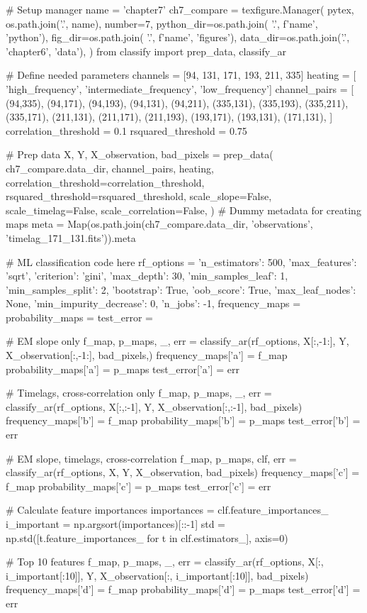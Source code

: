 \begin{pycode}
# Setup manager
name = 'chapter7'
ch7_compare = texfigure.Manager(
    pytex,
    os.path.join('.', name),
    number=7,
    python_dir=os.path.join( '.', f'{name}', 'python'),
    fig_dir=os.path.join( '.', f'{name}', 'figures'),
    data_dir=os.path.join('.', 'chapter6', 'data'),
)
from classify import prep_data, classify_ar

# Define needed parameters
channels = [94, 131, 171, 193, 211, 335]
heating = [ 'high_frequency', 'intermediate_frequency', 'low_frequency']
channel_pairs = [
    (94,335), (94,171), (94,193), (94,131), (94,211), (335,131), (335,193), (335,211), (335,171),
    (211,131), (211,171), (211,193), (193,171), (193,131), (171,131),
]
correlation_threshold = 0.1
rsquared_threshold = 0.75

# Prep data
X, Y, X_observation, bad_pixels = prep_data(
    ch7_compare.data_dir,
    channel_pairs,
    heating,
    correlation_threshold=correlation_threshold,
    rsquared_threshold=rsquared_threshold,
    scale_slope=False,
    scale_timelag=False,
    scale_correlation=False,
)
# Dummy metadata for creating maps
meta = Map(os.path.join(ch7_compare.data_dir, 'observations', 'timelag_171_131.fits')).meta

# ML classification code here
rf_options = {
    'n_estimators': 500,
    'max_features': 'sqrt',
    'criterion': 'gini',
    'max_depth': 30,
    'min_samples_leaf': 1,
    'min_samples_split': 2,
    'bootstrap': True,
    'oob_score': True,
    'max_leaf_nodes': None,
    'min_impurity_decrease': 0,
    'n_jobs': -1,
}
frequency_maps = {}
probability_maps = {}
test_error = {}

# EM slope only
f_map, p_maps, _, err = classify_ar(rf_options, X[:,-1:], Y, X_observation[:,-1:], bad_pixels,)
frequency_maps['a'] = f_map
probability_maps['a'] = p_maps
test_error['a'] = err

# Timelags, cross-correlation only
f_map, p_maps, _, err = classify_ar(rf_options, X[:,:-1], Y, X_observation[:,:-1], bad_pixels)
frequency_maps['b'] = f_map
probability_maps['b'] = p_maps
test_error['b'] = err

# EM slope, timelags, cross-correlation
f_map, p_maps, clf, err = classify_ar(rf_options, X, Y, X_observation, bad_pixels)
frequency_maps['c'] = f_map
probability_maps['c'] = p_maps
test_error['c'] = err

# Calculate feature importances
importances = clf.feature_importances_
i_important = np.argsort(importances)[::-1]
std = np.std([t.feature_importances_ for t in clf.estimators_], axis=0)

# Top 10 features
f_map, p_maps, _, err = classify_ar(rf_options, X[:, i_important[:10]], Y,
                                    X_observation[:, i_important[:10]], bad_pixels)
frequency_maps['d'] = f_map
probability_maps['d'] = p_maps
test_error['d'] = err
\end{pycode}

